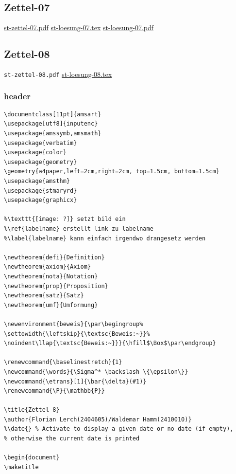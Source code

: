 \documentclass[11pt]{article}
\begin{document}
\subsection{Zettel-07}
\label{sec-3-7}

\href{file:///home/florian/Dropbox/st/st-zettel-07/st-zettel-07.pdf}{st-zettel-07.pdf}
\href{file:///home/florian/Dropbox/st/st-zettel-07/st-loesung-07.tex}{st-loesung-07.tex}
\href{file://.~/Dropbox/st/st-zettel-07/st-loesung-07.pdf}{st-loesung-07.pdf }
\subsection{Zettel-08}
\label{sec-3-8}

\texttt{st-zettel-08.pdf}
\href{file:///home/florian/Dropbox/st/st-zettel-08/st-loesung-08.tex}{st-loesung-08.tex}
\subsubsection{header}
\label{sec-3-8-1}


\begin{verbatim}
\documentclass[11pt]{amsart}
\usepackage[utf8]{inputenc}
\usepackage{amssymb,amsmath}
\usepackage{verbatim}
\usepackage{color}
\usepackage{geometry}
\geometry{a4paper,left=2cm,right=2cm, top=1.5cm, bottom=1.5cm} 
\usepackage{amsthm}
\usepackage{stmaryrd}
\usepackage{graphicx}

%\texttt{[image: ?]} setzt bild ein
%\ref{labelname} erstellt link zu labelname
%\label{labelname} kann einfach irgendwo drangesetz werden

\newtheorem{defi}{Definition}
\newtheorem{axiom}{Axiom}
\newtheorem{nota}{Notation}
\newtheorem{prop}{Proposition}
\newtheorem{satz}{Satz}
\newtheorem{umf}{Umformung}

\newenvironment{beweis}{\par\begingroup%
\settowidth{\leftskip}{\textsc{Beweis:~}}%
\noindent\llap{\textsc{Beweis:~}}}{\hfill$\Box$\par\endgroup}

\renewcommand{\baselinestretch}{1}
\newcommand{\words}{\Sigma^* \backslash \{\epsilon\}}
\newcommand{\etrans}[1]{\bar{\delta}(#1)}
\renewcommand{\P}{\mathbb{P}}

\title{Zettel 8}
\author{Florian Lerch(2404605)/Waldemar Hamm(2410010)}
%\date{} % Activate to display a given date or no date (if empty),
% otherwise the current date is printed 

\begin{document}
\maketitle
\end{verbatim}
\end{document}
